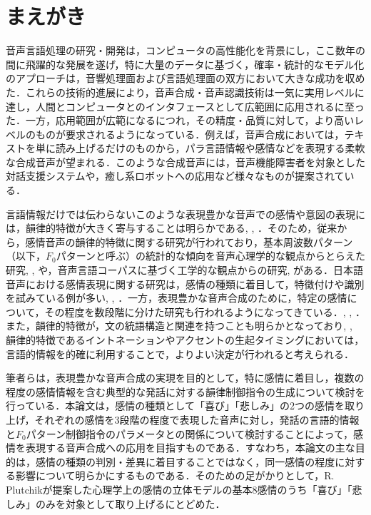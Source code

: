 \documentclass[japanese]{jnlp_1.3b}
\begin{document}
\maketitle



\section{まえがき}
音声言語処理の研究・開発は，コンピュータの高性能化を背景にし，ここ数年の間に飛躍的な発展を遂げ，特に大量のデータに基づく，確率・統計的なモデル化のアプローチは，音響処理面および言語処理面の双方において大きな成功を収めた．これらの技術的進展により，音声合成・音声認識技術は一気に実用レベルに達し，人間とコンピュータとのインタフェースとして広範囲に応用されるに至った．一方，応用範囲が広範になるにつれ，その精度・品質に対して，より高いレベルのものが要求されるようになっている．例えば，音声合成においては，テキストを単に読み上げるだけのものから，パラ言語情報や感情などを表現する柔軟な合成音声が望まれる．このような合成音声には，音声機能障害者を対象とした対話支援システム\cite{Ii2}や，癒し系ロボットへの応用など様々なものが提案されている．

言語情報だけでは伝わらないこのような表現豊かな音声での感情や意図の表現には，韻律的特徴が大きく寄与することは明らかである\cite{Rai}, \cite{Fuji}, \cite{Nikku}．そのため，従来から，感情音声の韻律的特徴に関する研究が行われており，基本周波数パターン（以下，$F_0$パターンと呼ぶ）の統計的な傾向を音声心理学的な観点からとらえた研究\cite{Naga}, \cite{As}, \cite{Sige}や，音声言語コーパスに基づく工学的な観点からの研究\cite{Koba}, \cite{Sagi}がある．日本語音声における感情表現に関する研究は，感情の種類に着目して，特徴付けや識別を試みている例が多い\cite{ITI}, \cite{Ii}, \cite{Kita}．一方，表現豊かな音声合成のために，特定の感情について，その程度を数段階に分けた研究も行われるようになってきている．\cite{Hasi}, \cite{kw2}, \cite{Nsima}．また，韻律的特徴が，文の統語構造と関連を持つことも明らかとなっており\cite{Hir}, \cite{Ume}, 韻律的特徴であるイントネーションやアクセントの生起タイミングにおいては，言語的情報を的確に利用することで，よりよい決定が行われると考えられる．

筆者らは，表現豊かな音声合成の実現を目的として，特に感情に着目し，複数の程度の感情情報を含む典型的な発話に対する韻律制御指令の生成について検討を行っている．本論文は，感情の種類として「喜び」「悲しみ」の2つの感情を取り上げ，それぞれの感情を3段階の程度で表現した音声に対し，発話の言語的情報と$F_0$パターン制御指令のパラメータとの関係について検討することによって，感情を表現する音声合成への応用を目指すものである．すなわち，本論文の主な目的は，感情の種類の判別・差異に着目することではなく，同一感情の程度に対する影響について明らかにするものである．そのための足がかりとして，R. Plutchikが提案した心理学上の感情の立体モデル\cite{PLU}の基本8感情のうち「喜び」「悲しみ」のみを対象として取り上げるにとどめた．
\end{document}
